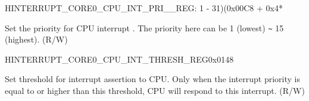 \begin{register}{H}{INTERRUPT\_CORE0\_CPU\_INT\_PRI\_\_REG}{: 1 - 31)(0x00C8 + 0x4*}\label{regdesc:INTERRUPTCORE0CPUINTPRI0REG}
%
%
\regnewline%
\begin{regdesc}\begin{reglist}
\label{fielddesc:INTERRUPTCORE0CPUPRI0MAP}\item [INTERRUPT\_CORE0\_CPU\_PRI\_\regindex{n}\_MAP] Set the priority for CPU interrupt . The priority here can be 1 (lowest) \verb+~+ 15 (highest). (R/W)
\end{reglist}\end{regdesc}
\end{register}

\begin{register}{H}{INTERRUPT\_CORE0\_CPU\_INT\_THRESH\_REG}{0x0148}\label{regdesc:INTERRUPTCORE0CPUINTTHRESHREG}
%
%
\regnewline%
\begin{regdesc}\begin{reglist}
\label{fielddesc:INTERRUPTCORE0CPUINTTHRESH}\item [INTERRUPT\_CORE0\_CPU\_INT\_THRESH] Set threshold for interrupt assertion to CPU. Only when the interrupt priority is equal to or higher than this threshold, CPU will respond to this interrupt. (R/W)
\end{reglist}\end{regdesc}
\end{register}
